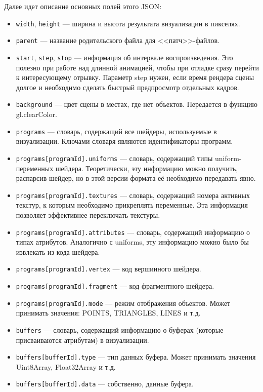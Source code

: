 Далее идет описание основных полей этого JSON:

\begin{itemize}
\item \texttt{width}, \texttt{height} --- ширина и высота результата визуализации в пикселях.
\item \texttt{parent} --- название родительского файла для <<патч>>-файлов.
\item \texttt{start}, \texttt{step}, \texttt{stop} --- информация об интервале воспроизведения. Это полезно при работе над длинной анимацией, чтобы при отладке сразу перейти к интересующему отрывку. Параметр step нужен, если время рендера сцены долгое и необходимо сделать быстрый предпросмотр отдельных кадров.
\item \texttt{background} --- цвет сцены в местах, где нет объектов. Передается в функцию gl.clearColor.
\item \texttt{programs} --- словарь, содержащий все шейдеры, используемые в визуализации. Ключами словаря являются идентификаторы программ.
\item \texttt{programs[programId].uniforms} --- словарь, содержащий типы uniform-переменных шейдера. Теоретически, эту информацию можно получить, распарсив шейдер, но в этой версии формата её необходимо передавать явно.
\item \texttt{programs[programId].textures} --- словарь, содержащий номера активных текстур, к которым необходимо прикреплять переменные. Эта информация позволяет эффективнее переключать текстуры.
\item \texttt{programs[programId].attributes} --- словарь, содержащий информацию о типах атрибутов. Аналогично с uniforms, эту информацию можно было бы извлекать из кода шейдера.
\item \texttt{programs[programId].vertex} --- код вершинного шейдера.
\item \texttt{programs[programId].fragment} --- код фрагментного шейдера.
\item \texttt{programs[programId].mode} --- режим отображения объектов. Может принимать значения: POINTS, TRIANGLES, LINES и т.д.
\item \texttt{buffers} --- словарь, содержащий информацию о буферах (которые присваиваются атрибутам) в визуализации.
\item \texttt{buffers[bufferId].type} --- тип данных буфера. Может принимать значения Uint8Array, Float32Array и т.д.
\item \texttt{buffers[bufferId].data} --- собственно, данные буфера.

\end{itemize}
